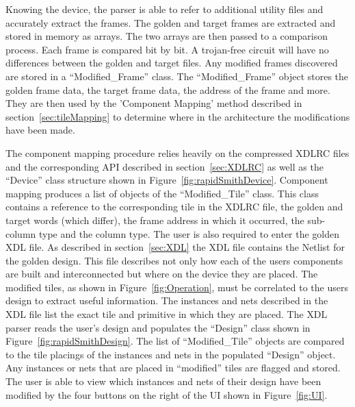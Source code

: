 Knowing the device, the parser is able to refer to additional utility files and accurately extract the frames.
The \gls{golden} and \gls{target} frames are extracted and stored in memory as arrays.
The two arrays are then passed to a comparison process.
Each frame is compared bit by bit.
A trojan-free circuit will have no differences between the \gls{golden} and \gls{target} files.
Any modified frames discovered are stored in a ``Modified\_Frame'' class.
The ``Modified\_Frame'' object stores the \gls{golden} frame data, the \gls{target} frame data, the address of the frame and more.
They are then used by the 'Component Mapping' method described in section~\ref{sec:tileMapping} to determine where in the architecture the modifications have been made.

The component mapping procedure relies heavily on the compressed XDLRC files and the corresponding \acrshort{API} described in section~\ref{sec:XDLRC} as well as the ``Device'' class structure shown in Figure~\ref{fig:rapidSmithDevice}.
Component mapping produces a list of objects of the ``Modified\_Tile'' class.
This class contains a reference to the corresponding tile in the XDLRC file, the \gls{golden} and \gls{target} words (which differ), the frame address in which it occurred, the sub-column type and the column type.
The user is also required to enter the \gls{golden} \acrshort{XDL} file.
As described in section~\ref{sec:XDL} the \acrshort{XDL} file contains the Netlist for the \gls{golden} design.
This file describes not only how each of the users components are built and interconnected but where on the device they are placed.
The modified tiles, as shown in Figure~\ref{fig:Operation}, must be correlated to the users design to extract useful information.
The instances and nets described in the \acrshort{XDL} file list the exact tile and primitive in which they are placed.
The \RapidSmith \acrshort{XDL} parser reads the user's design and populates the ``Design'' class shown in Figure~\ref{fig:rapidSmithDesign}.
The list of ``Modified\_Tile'' objects are compared to the tile placings of the instances and nets in the populated ``Design'' object.
Any instances or nets that are placed in ``modified'' tiles are flagged and stored.
The user is able to view which instances and nets of their design have been modified by the four buttons on the right of the \acrshort{UI} shown in Figure~\ref{fig:UI}.

